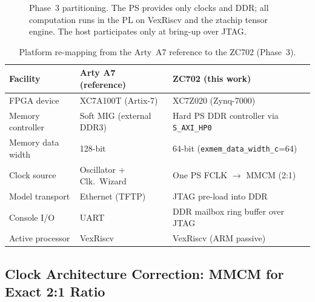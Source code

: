 \begin{figure}[H]
\caption{Phase~3 partitioning. The PS provides only clocks and DDR; all computation runs in the PL
on VexRiscv and the ztachip tensor engine. The host participates only at bring-up over JTAG.}
\label{fig:p3-arch}
\end{figure}

\begin{table}[H]
\centering
\caption{Platform re-mapping from the Arty~A7 reference to the ZC702 (Phase~3).}
\label{tab:p3-mapping}
\renewcommand{\arraystretch}{1.2}
\begin{tabular}{@{}lll@{}}
\toprule
\textbf{Facility} & \textbf{Arty A7 (reference)} & \textbf{ZC702 (this work)} \\
\midrule
FPGA device        & XC7A100T (Artix-7)        & XC7Z020 (Zynq-7000) \\
Memory controller  & Soft MIG (external DDR3)   & Hard PS DDR controller via \texttt{S\_AXI\_HP0} \\
Memory data width  & 128-bit                    & 64-bit (\texttt{exmem\_data\_width\_c}=64) \\
Clock source       & Oscillator + Clk.\ Wizard  & One PS FCLK $\rightarrow$ MMCM (2:1) \\
Model transport    & Ethernet (TFTP)            & JTAG pre-load into DDR \\
Console I/O        & UART                       & DDR mailbox ring buffer over JTAG \\
Active processor   & VexRiscv                   & VexRiscv (ARM passive) \\
\bottomrule
\end{tabular}
\end{table}


\subsection{Clock Architecture Correction: MMCM for Exact 2:1 Ratio}
\label{subsec:p3-clock}

